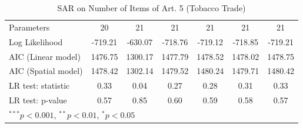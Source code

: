 \begin{table}[!h]
\begin{center}
\begin{tabular}{l c c c c c c }
Parameters              & 20           & 21           & 21           & 21           & 21           & 21           \\
Log Likelihood          & -719.21      & -630.07      & -718.76      & -719.12      & -718.85      & -719.21      \\
AIC (Linear model)      & 1476.75      & 1300.17      & 1477.79      & 1478.52      & 1478.02      & 1478.75      \\
AIC (Spatial model)     & 1478.42      & 1302.14      & 1479.52      & 1480.24      & 1479.71      & 1480.42      \\
LR test: statistic      & 0.33         & 0.04         & 0.27         & 0.28         & 0.31         & 0.33         \\
LR test: p-value        & 0.57         & 0.85         & 0.60         & 0.59         & 0.58         & 0.57         \\
\bottomrule
\multicolumn{7}{l}{\scriptsize{$^{***}p<0.001$, $^{**}p<0.01$, $^*p<0.05$}}
\end{tabular}
\caption{SAR on Number of Items of Art. 5 (Tobacco Trade)}
\label{table:coefficients}
\end{center}
\end{table}
